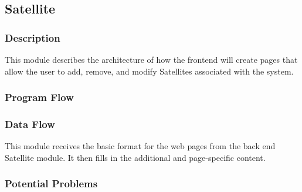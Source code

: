 
\subsection{Satellite}

\subsubsection{Description}

This module describes the architecture of how the frontend will create pages that allow the user to add, remove, and modify Satellites associated with the system. 



\subsubsection{Program Flow}




\subsubsection{Data Flow}

This module receives the basic format for the web pages from the back end Satellite module. 
It then fills in the additional and page-specific content. 






\subsubsection{Potential Problems}



